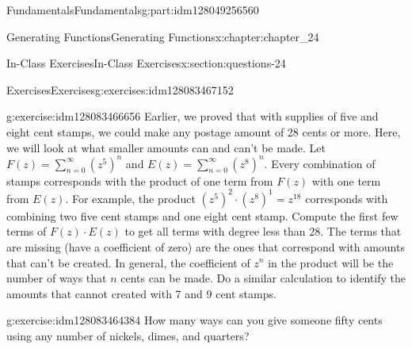 \documentclass[oneside,10pt,]{book}
\numberwithin{equation}{section}
\begin{document}
\begin{partptx}{Fundamentals}{}{Fundamentals}{}{}{g:part:idm128049256560}
\begin{chapterptx}{Generating Functions}{}{Generating Functions}{}{}{x:chapter:chapter_24}
\begin{sectionptx}{In-Class Exercises}{}{In-Class Exercises}{}{}{x:section:questions-24}
\begin{exercises-subsection}{Exercises}{}{Exercises}{}{}{g:exercises:idm128083467152}
\begin{exercisegroup}
\begin{divisionexerciseeg}{2}{}{}{g:exercise:idm128083466656}
Earlier, we proved that with supplies of five and eight cent stamps, we could make any postage amount of 28 cents or more.  Here, we will look at what smaller amounts can and can't be made.  Let \(F(z)= \sum_{n=0}^{\infty} (z^{5})^n\) and \(E(z)=\sum_{n=0}^{\infty} (z^{8})^n\).  Every combination of stamps corresponds with the product of one term from \(F(z)\) with one term from \(E(z)\).  For example, the product \((z^{5})^{2}\cdot (z^{8})^1= z^{18}\)  corresponds with combining two five cent stamps and one eight cent stamp.  Compute the first few terms of \(F(z)\cdot E(z)\) to  get all terms with degree less than 28. The terms that are missing (have a coefficient of zero) are the ones that correspond with amounts that can't be created.  In general, the coefficient of \(z^n\) in the product will be the number of ways that \(n\) cents can be made. Do a similar calculation to identify the amounts that cannot created with 7 and 9 cent stamps.%
\end{divisionexerciseeg}%
\begin{divisionexerciseeg}{3}{}{}{g:exercise:idm128083464384}%
How many ways can you give someone fifty cents using any number of nickels, dimes, and quarters?%
\end{divisionexerciseeg}%
\end{exercisegroup}
\par\medskip\noindent
\end{exercises-subsection}
\end{sectionptx}
\end{chapterptx}
\end{partptx}
%
%
\typeout{************************************************}
\typeout{************************************************}
%
\end{document}
